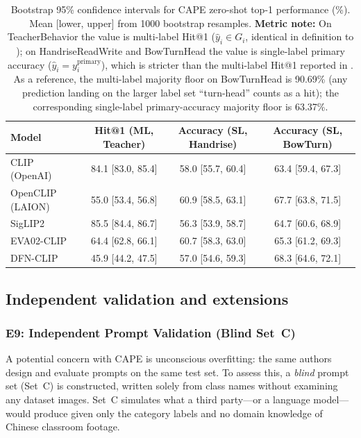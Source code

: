 \documentclass[symmetry,article,submit,pdftex,moreauthors]{Definitions/mdpi}
\begin{document}
\begin{table}[H]
\caption{Bootstrap 95\% confidence intervals for CAPE zero-shot top-1 performance (\%). Mean [lower, upper] from 1000 bootstrap resamples. \textbf{Metric note:} On TeacherBehavior the value is multi-label Hit@1 ($\hat{y}_i\in G_i$, identical in definition to ); on HandriseReadWrite and BowTurnHead the value is single-label primary accuracy ($\hat{y}_i=y^{\text{primary}}_i$), which is stricter than the multi-label Hit@1 reported in . As a reference, the multi-label majority floor on BowTurnHead is 90.69\% (any prediction landing on the larger label set ``turn-head'' counts as a hit); the corresponding single-label primary-accuracy majority floor is 63.37\%.}
\label{tab:bootstrap_ci}
\centering
\small
\setlength{\tabcolsep}{3pt}
\begin{tabular}{l ccc}
\toprule
\textbf{Model} & \textbf{Hit@1 (ML, Teacher)} & \textbf{Accuracy (SL, Handrise)} & \textbf{Accuracy (SL, BowTurn)} \\
\midrule
CLIP (OpenAI) & 84.1 [83.0, 85.4] & 58.0 [55.7, 60.4] & 63.4 [59.4, 67.3] \\
OpenCLIP (LAION) & 55.0 [53.4, 56.8] & 60.9 [58.5, 63.1] & 67.7 [63.8, 71.5] \\
SigLIP2 & 85.5 [84.4, 86.7] & 56.3 [53.9, 58.7] & 64.7 [60.6, 68.9] \\
EVA02-CLIP & 64.4 [62.8, 66.1] & 60.7 [58.3, 63.0] & 65.3 [61.2, 69.3] \\
DFN-CLIP & 45.9 [44.2, 47.5] & 57.0 [54.6, 59.3] & 68.3 [64.6, 72.1] \\
\bottomrule
\end{tabular}
\end{table}


\subsection{Independent validation and extensions}

\subsubsection{E9: Independent Prompt Validation (Blind Set~C)}
\label{sec:e9_blind}

A potential concern with CAPE is unconscious overfitting: the same authors design and evaluate prompts on the same test set. To assess this, a \emph{blind} prompt set (Set~C) is constructed, written solely from class names without examining any dataset images. Set~C simulates what a third party---or a language model---would produce given only the category labels and no domain knowledge of Chinese classroom footage.
\end{document}
